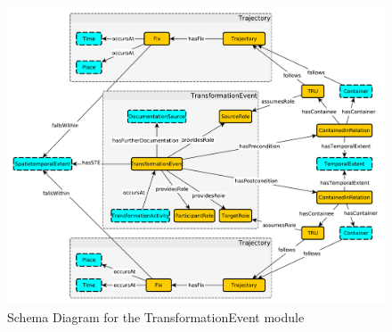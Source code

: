 \begin{figure}[tb]
\begin{center}
\includegraphics[width=.9\textwidth]{diagrams/transformation-event}
\end{center}
\caption{Schema Diagram for the TransformationEvent module}
\label{fig:TransformationEvent}
\end{figure}

